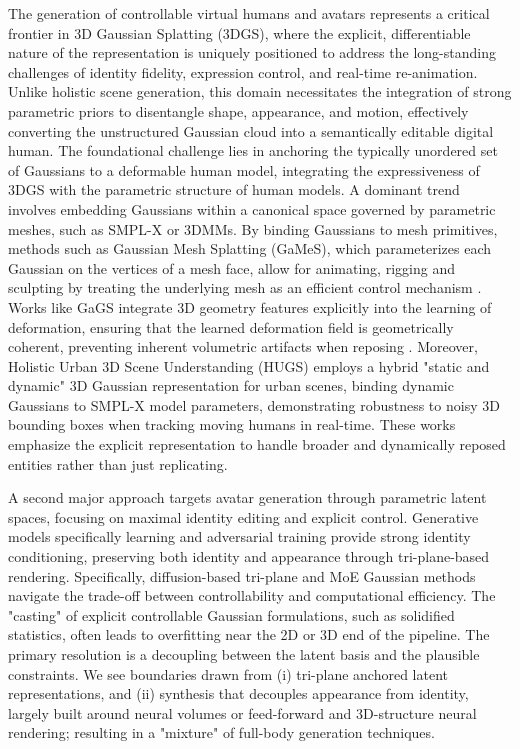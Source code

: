 \documentclass[11pt,a4paper]{article}
\begin{document}
The generation of controllable virtual humans and avatars represents a critical frontier in 3D Gaussian Splatting (3DGS), where the explicit, differentiable nature of the representation is uniquely positioned to address the long-standing challenges of identity fidelity, expression control, and real-time re-animation. Unlike holistic scene generation, this domain necessitates the integration of strong parametric priors to disentangle shape, appearance, and motion, effectively converting the unstructured Gaussian cloud into a semantically editable digital human. The foundational challenge lies in anchoring the typically unordered set of Gaussians to a deformable human model, integrating the expressiveness of 3DGS with the parametric structure of human models. A dominant trend involves embedding Gaussians within a canonical space governed by parametric meshes, such as SMPL-X or 3DMMs. By binding Gaussians to mesh primitives, methods such as Gaussian Mesh Splatting (GaMeS), which parameterizes each Gaussian on the vertices of a mesh face, allow for animating, rigging and sculpting by treating the underlying mesh as an efficient control mechanism \cite{arxiv:2402.01459v3}. Works like GaGS integrate 3D geometry features explicitly into the learning of deformation, ensuring that the learned deformation field is geometrically coherent, preventing inherent volumetric artifacts when reposing \cite{arxiv:2404.06270v2}. Moreover, Holistic Urban 3D Scene Understanding (HUGS) employs a hybrid "static and dynamic" 3D Gaussian representation for urban scenes, binding dynamic Gaussians to SMPL-X model parameters, demonstrating robustness to noisy 3D bounding boxes when tracking moving humans in real-time. These works emphasize the explicit representation to handle broader and dynamically reposed entities rather than just replicating.

A second major approach targets avatar generation through parametric latent spaces, focusing on maximal identity editing and explicit control. Generative models specifically learning and adversarial training provide strong identity conditioning, preserving both identity and appearance through tri-plane-based rendering. Specifically, diffusion-based tri-plane and MoE Gaussian methods navigate the trade-off between controllability and computational efficiency. The "casting" of explicit controllable Gaussian formulations, such as solidified statistics, often leads to overfitting near the 2D or 3D end of the pipeline. The primary resolution is a decoupling between the latent basis and the plausible constraints. We see boundaries drawn from (i) tri-plane anchored latent representations, and (ii) synthesis that decouples appearance from identity, largely built around neural volumes or feed-forward and 3D-structure neural rendering; resulting in a "mixture" of full-body generation techniques.
\end{document}
